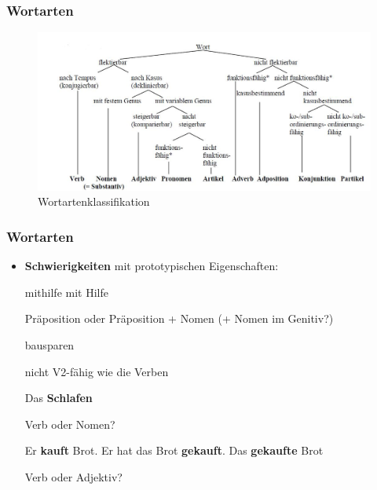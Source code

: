 \begin{frame}
\frametitle{Wortarten}

\begin{figure}
\centering
	\includegraphics[scale=.4]{material/07wortartenklassifikation}
	\caption{Wortartenklassifikation \citep{Repp&Co15a}}
\end{figure}

\end{frame}


\begin{frame}
\frametitle{Wortarten}

\begin{itemize}
	\item \textbf{Schwierigkeiten} mit prototypischen Eigenschaften:

	\eal 
	\ex mithilfe 
	\ex mit Hilfe
	\zl
	
\pause 
Präposition oder Präposition + Nomen (+ Nomen im Genitiv?)
\pause

	\ea bausparen 
	\z

\pause	
	nicht V2-fähig wie die  Verben
\pause

	\ea Das \textbf{Schlafen}
	\z

\pause
Verb oder Nomen?
\pause

	\eal
	\ex Er \textbf{kauft} Brot. 
	\ex Er hat das Brot \textbf{gekauft}.
\pause
	\ex Das \textbf{gekaufte} Brot
	\zl
	
\pause
Verb oder Adjektiv?

\end{itemize}

\end{frame}


